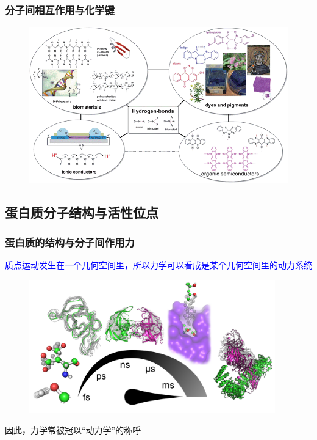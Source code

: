 \frame
{
	\frametitle{分子间相互作用与化学键}
\begin{figure}[h!]
\centering
\vspace{-25.5pt}
\includegraphics[height=0.67\textwidth,width=1.0\textwidth,viewport=0 0 830 500,clip]{Figures/Bio-H-bond-1.png}
\label{Bio-H-bond}
\end{figure}
}

\subsection{蛋白质分子结构与活性位点}
\frame
{
	\frametitle{蛋白质的结构与分子间作用力}
\textcolor{blue}{质点运动发生在一个几何空间里，所以力学可以看成是某个几何空间里的动力系统}
\begin{figure}[h!]
\centering
\vspace{-40.5pt}
\includegraphics[height=0.65\textwidth,width=0.95\textwidth,viewport=0 0 470 290,clip]{Figures/Protein-structure.png}
\label{Protein-structure-1}
\end{figure}
因此，力学常被冠以``动力学''的称呼
}

